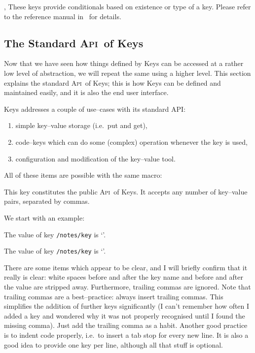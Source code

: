 \documentclass[a4paper,doc2]{ltxdoc}
\def\API{\textsc{Api}}%
\begin{document}
\begin{commandlist}{%
	\pgfkeysifdefined{},
	\pgfkeysifassignable{}}
	These keys provide conditionals based on existence or type of a key. Please refer to the reference manual in~\cite{tikz} for details.
\end{commandlist}

\subsection{The Standard \API\ of \PGF Keys}
\begingroup
{}
Now that we have seen how things defined by \PGF Keys can be accessed at a rather low level of abstraction, we will repeat the same using a higher level. This section explains the standard \API\ of \PGF Keys; this is how Keys can be defined and maintained easily, and it is also the end user interface.

\PGF Keys addresses a couple of use--cases with its standard API:
\begin{enumerate}
	\item simple key--value storage (i.e.\ put and get),
	\item code--keys which can do some (complex) operation whenever the key is used,
	\item configuration and modification of the key--value tool.
\end{enumerate}
All of these items are possible with the same macro:

\begin{command}{\pgfkeys{}}
	This key constitutes the public \API\ of \PGF Keys. It accepts any number of key--value pairs, separated by commas.
\end{command}

We start with an example:
\begin{codeexample}[]

The value of key \texttt{/notes/key} is `'.


The value of key \texttt{/notes/key} is `'.
\end{codeexample}

There are some items which appear to be clear, and I will briefly confirm that it really is clear: white spaces before and after the key name and before and after the value are stripped away. Furthermore, trailing commas are ignored. Note that trailing commas are a best--practice: always insert trailing commas. This simplifies the addition of further keys significantly (I can't remember how often I added a key and wondered why it was not properly recognised until I found the missing comma). Just add the trailing comma as a habit. Another good practice is to indent code properly, i.e.\ to insert a tab stop for every new line. It is also a good idea to provide one key per line, although all that stuff is optional.
\end{document}
